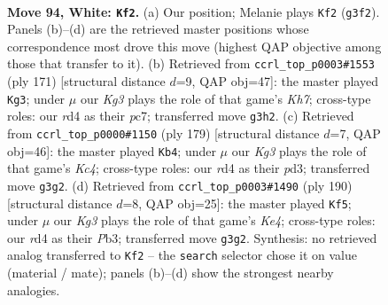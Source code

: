 \documentclass[11pt]{article}
\begin{document}
\clearpage

\begin{figure}[p]\centering
\begin{subfigure}{0.46\textwidth}\centering
\resizebox{\linewidth}{!}{%
\newchessgame
\chessboard[
  setfen={8/2k5/8/1R6/3r3P/r5K1/8/8 w - - 29 94},
  showmover=false,
  pgfstyle=straightmove, color=movearrow, markmove={g3-f2}
]}
\caption{}
\end{subfigure}\hfill
\begin{subfigure}{0.46\textwidth}\centering
\resizebox{\linewidth}{!}{%
\newchessgame
\chessboard[
  setfen={8/2P5/7R/8/3K4/8/6pk/2r5 b - - 2 86},
  showmover=false,
  pgfstyle=straightmove, color=movearrow, markmove={h2-g3}
]}
\caption{}
\end{subfigure}
\\[4pt]
\begin{subfigure}{0.46\textwidth}\centering
\resizebox{\linewidth}{!}{%
\newchessgame
\chessboard[
  setfen={r7/8/8/2k1K3/3p4/3P4/8/2R5 b - - 9 90},
  showmover=false,
  pgfstyle=straightmove, color=movearrow, markmove={c5-b4}
]}
\caption{}
\end{subfigure}\hfill
\begin{subfigure}{0.46\textwidth}\centering
\resizebox{\linewidth}{!}{%
\newchessgame
\chessboard[
  setfen={8/4k3/6R1/8/4KP2/1P6/4r3/8 w - - 1 96},
  showmover=false,
  pgfstyle=straightmove, color=movearrow, markmove={e4-f5}
]}
\caption{}
\end{subfigure}
\caption{\textbf{Move 94, White: \texttt{Kf2}.} (a) Our position; Melanie plays \texttt{Kf2} (\texttt{g3f2}). Panels (b)--(d) are the retrieved master positions whose correspondence most drove this move (highest QAP objective among those that transfer to it). (b) Retrieved from \texttt{ccrl\_top\_p0003\#1553} (ply 171) [structural distance $d$=9, QAP obj=47]: the master played \texttt{Kg3}; under $\mu$ our \emph{Kg3} plays the role of that game's \emph{Kh7}; cross-type roles: our \emph{r}d4 as their \emph{p}c7; transferred move \texttt{g3h2}. (c) Retrieved from \texttt{ccrl\_top\_p0000\#1150} (ply 179) [structural distance $d$=7, QAP obj=46]: the master played \texttt{Kb4}; under $\mu$ our \emph{Kg3} plays the role of that game's \emph{Kc4}; cross-type roles: our \emph{r}d4 as their \emph{p}d3; transferred move \texttt{g3g2}. (d) Retrieved from \texttt{ccrl\_top\_p0003\#1490} (ply 190) [structural distance $d$=8, QAP obj=25]: the master played \texttt{Kf5}; under $\mu$ our \emph{Kg3} plays the role of that game's \emph{Ke4}; cross-type roles: our \emph{r}d4 as their \emph{P}b3; transferred move \texttt{g3g2}. Synthesis: no retrieved analog transferred to \texttt{Kf2} -- the \texttt{search} selector chose it on value (material / mate); panels (b)--(d) show the strongest nearby analogies.}
\label{fig:thought-m186}
\end{figure}
\end{document}
